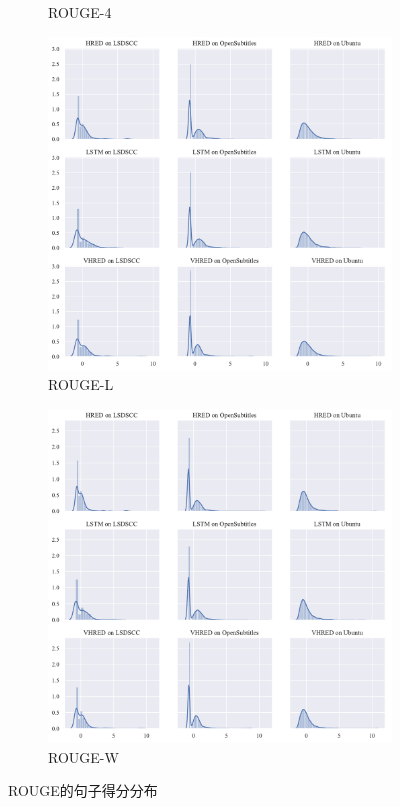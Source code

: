 \begin{figure}[H]
\begin{subfigure}{0.5\linewidth}
        \caption{ROUGE-4}
    \end{subfigure}
    \begin{subfigure}{0.5\linewidth}
        \centering
        \includegraphics[width=\linewidth]{figure/distplot_grid/rouge_l/plot.pdf}
        \caption{ROUGE-L}
    \end{subfigure}%
    \begin{subfigure}{0.5\linewidth}
        \centering
        \includegraphics[width=\linewidth]{figure/distplot_grid/rouge_w/plot.pdf}
        \caption{ROUGE-W}
    \end{subfigure}
    \centering
    \caption{ROUGE的句子得分分布}
\end{figure}
